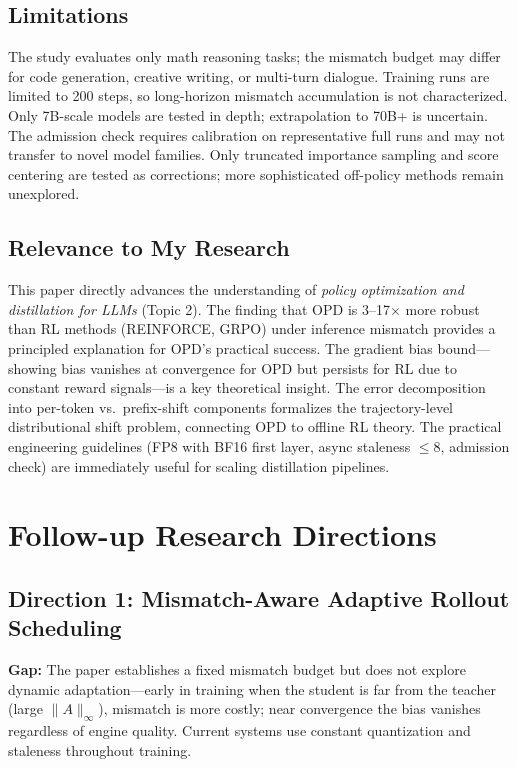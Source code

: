 \documentclass[11pt,a4paper]{article}
\begin{document}
\subsection{Limitations}
The study evaluates only math reasoning tasks; the mismatch budget may differ for code generation, creative writing, or multi-turn dialogue. Training runs are limited to 200 steps, so long-horizon mismatch accumulation is not characterized. Only 7B-scale models are tested in depth; extrapolation to 70B+ is uncertain. The admission check requires calibration on representative full runs and may not transfer to novel model families. Only truncated importance sampling and score centering are tested as corrections; more sophisticated off-policy methods remain unexplored.

\subsection{Relevance to My Research}
This paper directly advances the understanding of \emph{policy optimization and distillation for LLMs} (Topic 2). The finding that OPD is 3--17$\times$ more robust than RL methods (REINFORCE, GRPO) under inference mismatch provides a principled explanation for OPD's practical success. The gradient bias bound---showing bias vanishes at convergence for OPD but persists for RL due to constant reward signals---is a key theoretical insight. The error decomposition into per-token vs.\ prefix-shift components formalizes the trajectory-level distributional shift problem, connecting OPD to offline RL theory. The practical engineering guidelines (FP8 with BF16 first layer, async staleness $\leq$8, admission check) are immediately useful for scaling distillation pipelines.

\section{Follow-up Research Directions}

\subsection{Direction 1: Mismatch-Aware Adaptive Rollout Scheduling}
\textbf{Gap:} The paper establishes a fixed mismatch budget but does not explore dynamic adaptation---early in training when the student is far from the teacher (large $\|A\|_\infty$), mismatch is more costly; near convergence the bias vanishes regardless of engine quality. Current systems use constant quantization and staleness throughout training.
\end{document}
